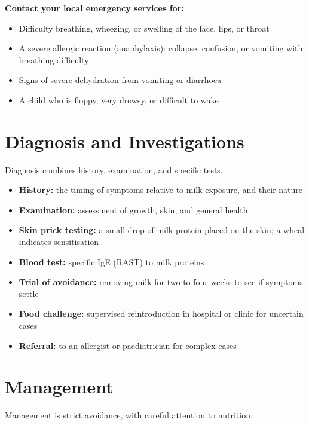 \textbf{Contact your local emergency services for:}
\begin{itemize}
    \item Difficulty breathing, wheezing, or swelling of the face, lips, or throat
    \item A severe allergic reaction (anaphylaxis): collapse, confusion, or vomiting with breathing difficulty
    \item Signs of severe dehydration from vomiting or diarrhoea
    \item A child who is floppy, very drowsy, or difficult to wake
\end{itemize}

\section*{Diagnosis and Investigations}
Diagnosis combines history, examination, and specific tests.

\begin{itemize}
    \item \textbf{History:} the timing of symptoms relative to milk exposure, and their nature
    \item \textbf{Examination:} assessment of growth, skin, and general health
    \item \textbf{Skin prick testing:} a small drop of milk protein placed on the skin; a wheal indicates sensitisation
    \item \textbf{Blood test:} specific IgE (RAST) to milk proteins
    \item \textbf{Trial of avoidance:} removing milk for two to four weeks to see if symptoms settle
    \item \textbf{Food challenge:} supervised reintroduction in hospital or clinic for uncertain cases
    \item \textbf{Referral:} to an allergist or paediatrician for complex cases
\end{itemize}

\section*{Management}
Management is strict avoidance, with careful attention to nutrition.

